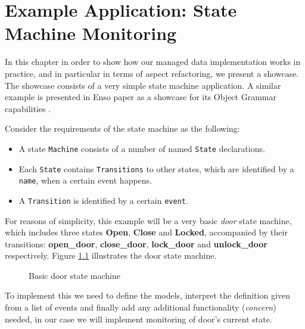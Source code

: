 
\chapter{Example Application: State Machine Monitoring}\label{Example Application}
In this chapter in order to show how our managed data implementation works in practice, and in particular in terms of aspect refactoring, we present a showcase.
The showcase consists of a very simple state machine application.
A similar example is presented in Enso paper as a showcase for its Object Grammar capabilities \cite{storm2012object}.

Consider the requirements of the state machine as the following: 
\begin{itemize}
	\item A state \texttt{Machine} consists of a number of named \texttt{State} declarations.

	\item Each \texttt{State} contains \texttt{Transitions} to other states, which are identified by a \texttt{name}, when a certain event happens.

	\item A \texttt{Transition} is identified by a certain \texttt{event}.
\end{itemize}

For reasons of simplicity, this example will be a very basic \textit{door} state machine, which includes three states \textbf{Open}, \textbf{Close} and \textbf{Locked}, accompanied by their transitions: \textbf{open\_door}, \textbf{close\_door}, \textbf{lock\_door} and \textbf{unlock\_door} respectively.
Figure \ref{fig:State_machine} illustrates the door state machine.

\begin{figure}[H]
	\centering
  	\caption{Basic door state machine}
  	\label{fig:State_machine}
\end{figure}

To implement this we need to define the models, interpret the definition given from a list of events and finally add any additional functionality (\textit{concern}) needed, in our case we will implement monitoring of door's current state.

